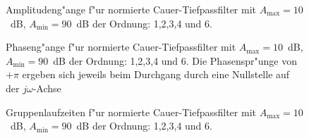 \begin{figure}[!htb]%
\begin{center}\vspace*{-0mm} 
  \vspace*{-3mm}\caption{Amplitudeng"ange f"ur normierte Cauer-Tiefpassfilter mit $A_{\text{max}}=10$~dB, $A_{\text{min}}=90$~dB  der Ordnung: 1,2,3,4 und 6.}
\end{center}
\vspace*{-6mm} 
\end{figure}

\begin{figure}[!htb]%
\begin{center}\vspace*{-0mm} 
  \vspace*{-3mm}\caption{Phaseng"ange f"ur normierte Cauer-Tiefpassfilter mit $A_{\text{max}}=10$~dB, $A_{\text{min}}=90$~dB  der Ordnung: 1,2,3,4 und 6. Die Phasenspr"unge von $+\pi$ ergeben sich jeweils beim Durchgang durch eine Nullstelle auf der $j\omega$-Achse}
\end{center}
\vspace*{-6mm} 
\end{figure}

\clearpage
\begin{figure}[!htb]%
\begin{center}\vspace*{-0mm} 
  \vspace*{-3mm}\caption{Gruppenlaufzeiten f"ur normierte Cauer-Tiefpassfilter mit $A_{\text{max}}=10$~dB, $A_{\text{min}}=90$~dB  der Ordnung: 1,2,3,4 und 6.}
\end{center}
\vspace*{-6mm} 
\end{figure}


